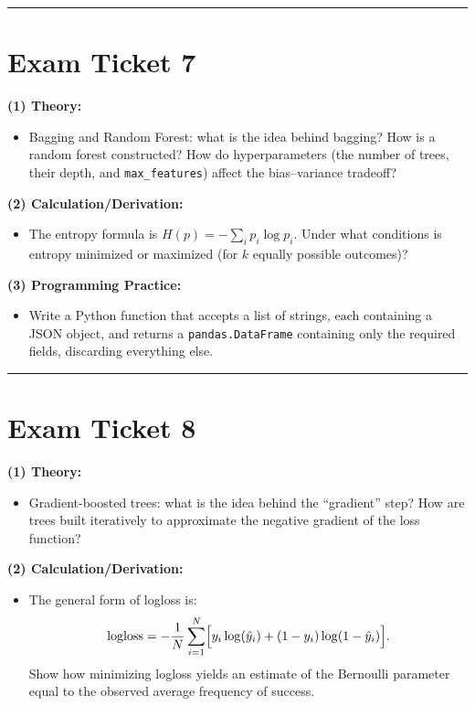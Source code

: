\documentclass[a4paper,12pt]{article}
\begin{document}
\noindent\rule{\textwidth}{0.4pt}
\newpage

\section*{Exam Ticket 7}
\textbf{(1) Theory:}
\begin{itemize}
  \item Bagging and Random Forest: what is the idea behind bagging? How is a random forest constructed? How do hyperparameters (the number of trees, their depth, and \texttt{max\_features}) affect the bias--variance tradeoff?
\end{itemize}

\textbf{(2) Calculation/Derivation:}
\begin{itemize}
  \item The entropy formula is $H(p) = -\sum_i p_i \log p_i$. Under what conditions is entropy minimized or maximized (for $k$ equally possible outcomes)?
\end{itemize}

\textbf{(3) Programming Practice:}
\begin{itemize}
  \item Write a Python function that accepts a list of strings, each containing a JSON object, and returns a \texttt{pandas.DataFrame} containing only the required fields, discarding everything else.
\end{itemize}

\noindent\rule{\textwidth}{0.4pt}
\newpage

\section*{Exam Ticket 8}
\textbf{(1) Theory:}
\begin{itemize}
  \item Gradient-boosted trees: what is the idea behind the ``gradient'' step? How are trees built iteratively to approximate the negative gradient of the loss function?
\end{itemize}

\textbf{(2) Calculation/Derivation:}
\begin{itemize}
  \item The general form of logloss is:
    \[
      \text{logloss} = -\frac{1}{N}\sum_{i=1}^N \Bigl[ y_i \log(\hat{y}_i) + (1-y_i)\log(1-\hat{y}_i) \Bigr].
    \]
    Show how minimizing logloss yields an estimate of the Bernoulli parameter equal to the observed average frequency of success.
\end{itemize}
\end{document}
